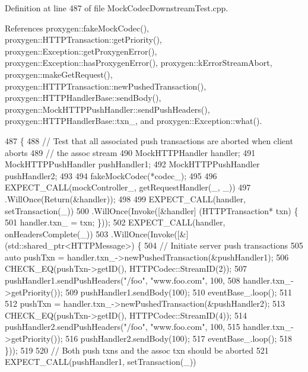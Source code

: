 Definition at line 487 of file Mock\+Codec\+Downstream\+Test.\+cpp.



References proxygen\+::fake\+Mock\+Codec(), proxygen\+::\+H\+T\+T\+P\+Transaction\+::get\+Priority(), proxygen\+::\+Exception\+::get\+Proxygen\+Error(), proxygen\+::\+Exception\+::has\+Proxygen\+Error(), proxygen\+::k\+Error\+Stream\+Abort, proxygen\+::make\+Get\+Request(), proxygen\+::\+H\+T\+T\+P\+Transaction\+::new\+Pushed\+Transaction(), proxygen\+::\+H\+T\+T\+P\+Handler\+Base\+::send\+Body(), proxygen\+::\+Mock\+H\+T\+T\+P\+Push\+Handler\+::send\+Push\+Headers(), proxygen\+::\+H\+T\+T\+P\+Handler\+Base\+::txn\+\_\+, and proxygen\+::\+Exception\+::what().


\begin{DoxyCode}
487                                                       \{
488   \textcolor{comment}{// Test that all associated push transactions are aborted when client aborts}
489   \textcolor{comment}{// the assoc stream}
490   MockHTTPHandler handler;
491   MockHTTPPushHandler pushHandler1;
492   MockHTTPPushHandler pushHandler2;
493 
494   fakeMockCodec(*codec\_);
495 
496   EXPECT\_CALL(mockController\_, getRequestHandler(\_, \_))
497     .WillOnce(Return(&handler));
498 
499   EXPECT\_CALL(handler, setTransaction(\_))
500     .WillOnce(Invoke([&handler] (HTTPTransaction* txn) \{
501           handler.txn_ = txn; \}));
502   EXPECT\_CALL(handler, onHeadersComplete(\_))
503     .WillOnce(Invoke([&] (std::shared\_ptr<HTTPMessage>) \{
504           \textcolor{comment}{// Initiate server push transactions}
505           \textcolor{keyword}{auto} pushTxn = handler.txn_->newPushedTransaction(&pushHandler1);
506           CHECK\_EQ(pushTxn->getID(), HTTPCodec::StreamID(2));
507           pushHandler1.sendPushHeaders(\textcolor{stringliteral}{"/foo"}, \textcolor{stringliteral}{"www.foo.com"}, 100,
508                                        handler.txn_->getPriority());
509           pushHandler1.sendBody(100);
510           eventBase\_.loop();
511 
512           pushTxn = handler.txn_->newPushedTransaction(&pushHandler2);
513           CHECK\_EQ(pushTxn->getID(), HTTPCodec::StreamID(4));
514           pushHandler2.sendPushHeaders(\textcolor{stringliteral}{"/foo"}, \textcolor{stringliteral}{"www.foo.com"}, 100,
515                                        handler.txn_->getPriority());
516           pushHandler2.sendBody(100);
517           eventBase\_.loop();
518         \}));
519 
520   \textcolor{comment}{// Both push txns and the assoc txn should be aborted}
521   EXPECT\_CALL(pushHandler1, setTransaction(\_))

\end{DoxyCode}
